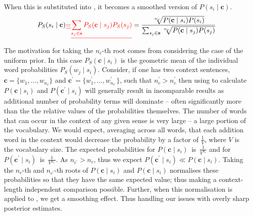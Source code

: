 \documentclass{article} %
\renewcommand{\c}{\mathbf{c}}
\newcommand{\s}{\mathbf{s}}
\providecommand{\DIFdel}[1]{{\protect\color{red}\sout{#1}}}                      %
\providecommand{\DIFdelbegin}{} %
\providecommand{\DIFdelend}{} %
\begin{document}
When this is substituted into , it becomes a smoothed version of $P(s_{i} \mid \c)$.
\begin{equation} \label{eq:generalwsdsmoothed}
\begin{aligned}
P_S(s_{i}\mid\c) %
\DIFdelbegin %
\DIFdel{=}%
\DIFdel{\sum_{s_{j}\in\s} P_{S}(\c \mid s_{j}) P_S(s_{j})}%
\DIFdelend %
%
\DIFdelbegin %
\DIFdelend %
=\dfrac{\sqrt[n_c]{P(\c\mid s_{i})P(s_{i})}}
{\sum_{s_{j}\in\s} \sqrt[n_c]{P(\c \mid s_{j})P(s_{j})}} \\
%
\end{aligned}
\end{equation}
The motivation for taking the $n_c$-th root comes from considering the case of the uniform prior.
In this case $P_S(\c \mid s_{i})$ is the geometric mean of the individual word probabilities $P_S(w_j \mid s_{i})$.
Consider, if one has two context sentences, $\c=\{w_1,...,w_{n_c}\}$ and $\c^\prime=\{w_1^\prime,...,w^\prime_{n_{c^\prime}}\}$, such that $n_c^\prime > n_c^\prime$
then using  to calculate $P(\c \mid s_{i})$ and $P(\c^\prime \mid s_{i})$ will generally result in incomparable results as additional number of probability terms will dominate -- often significantly more than the the relative values of the probabilities themselves.
The number of words that can occur in the context of any given sense is very large -- a large portion of the vocabulary. We would expect, averaging across all words, that each addition word in the context would decrease the probability by a factor of $\frac{1}{V}$, where  $V$ is the vocabulary size. 
The expected probabilities for \mbox{$P(\c \mid s_{i})$ is $\frac{1}{V^{n_c}}$} and for \mbox{$P(\c^\prime \mid s_{i})$ is $\frac{1}{V^{n_{c^\prime}}}$}. As $n_{c^\prime} > n_c$, thus we expect $P(\c^\prime \mid s_{i}) \ll P(\c \mid s_{i})$.
Taking the $n_{c}$-th and $n_{c^\prime}$-th roots of $P(\c \mid s_{i})$ and $P(\c \mid s_{i})$ normalises these probabilities so that they have the same expected value; thus making a context-length independent comparison possible.
Further, when this normalisation is applied to , we get a smoothing effect. Thus handling our issues with overly sharp posterior estimates.
\end{document}
